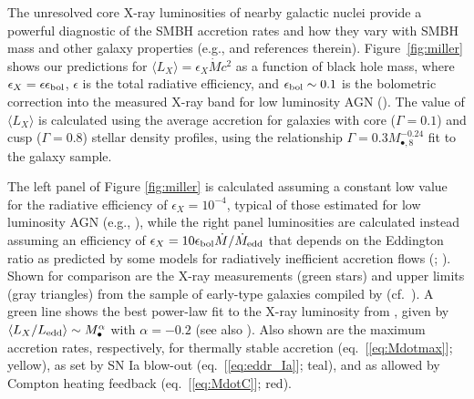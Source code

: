 \documentclass[usenatbib,fleqn]{mn2e}
\newcommand{\Mbh}[1][]{M_{\bullet#1}}
\newcommand{\Mbheight}{M_{\bullet,8}}
\begin{document}
The unresolved core X-ray luminosities of nearby galactic nuclei provide a
powerful diagnostic of the SMBH accretion rates and how they vary with
SMBH mass and other galaxy properties (e.g., \citealt{Ho08} and
references therein).  Figure~\ref{fig:miller} shows our predictions
for $\langle L_{X} \rangle =\epsilon_X \dot{M} c^2$ as a function of
black hole mass, where $\epsilon_{X} = \epsilon\epsilon_{\rm bol}$,
$\epsilon$ is the total radiative efficiency, and $\epsilon_{\rm bol}
\sim 0.1$ is the bolometric correction into the measured X-ray band
for low luminosity AGN (\citealt{Ho08}).  The value of $\langle L_X
\rangle$ is calculated using the average accretion for galaxies with
core ($\Gamma = 0.1$) and cusp ($\Gamma = 0.8$) stellar density
profiles, using the relationship $\Gamma = 0.3 \Mbheight^{-0.24}$ fit
to the \citet{LauerFaber+:2007a} galaxy sample.

The left panel of Figure \ref{fig:miller} is calculated assuming a
constant low value for the radiative efficiency of $\epsilon_X =
10^{-4}$, typical of those estimated for low luminosity AGN (e.g.,
\citealt{Ho:2009a}), while the right panel luminosities are calculated
instead assuming an efficiency of $\epsilon_X= 10 \epsilon_{\rm
  bol}\dot{M}/\dot{M}_{\rm edd}$ that depends on the Eddington ratio
as predicted by some models for radiatively inefficient accretion
flows (\citealt{Narayan&Yi95}; \citealt{Narayan+98}).  Shown for
comparison are the X-ray measurements (green stars) and upper limits
(gray triangles) from the sample of early-type galaxies compiled by
\citet{Miller+15} (cf.~\citealt{Gallo+10}).  A green line shows the
best power-law fit to the X-ray luminosity from \citet{Miller+15},
given by $\langle L_X/L_{\rm edd}\rangle \sim \Mbh^\alpha$ with
$\alpha = -0.2$ (see also \citealt{Zhang+09, Pellegrini10, Gallo+10}).
Also shown are the maximum accretion rates, respectively, for
thermally stable accretion (eq.~[\ref{eq:Mdotmax}]; yellow), as set by
SN Ia blow-out (eq.~[\ref{eq:eddr_Ia}]; teal), and as allowed by
Compton heating feedback (eq.~[\ref{eq:MdotC}]; red).
\end{document}
